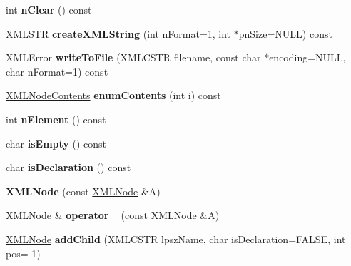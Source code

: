 \begin{DoxyCompactItemize}
int {\bfseries n\+Clear} () const
\item 
\mbox{\label{struct_x_m_l_node_a9e19d3587f88f503ff1cfd98fcd13cb1}} 
X\+M\+L\+S\+TR {\bfseries create\+X\+M\+L\+String} (int n\+Format=1, int $\ast$pn\+Size=N\+U\+LL) const
\item 
\mbox{\label{struct_x_m_l_node_acef9de855bd31c6cda5482cb296f28ae}} 
X\+M\+L\+Error {\bfseries write\+To\+File} (X\+M\+L\+C\+S\+TR filename, const char $\ast$encoding=N\+U\+LL, char n\+Format=1) const
\item 
\mbox{\label{struct_x_m_l_node_a2406beecada2b815907eaac2c7db035b}} 
\hyperlink{struct_x_m_l_node_contents}{X\+M\+L\+Node\+Contents} {\bfseries enum\+Contents} (int i) const
\item 
\mbox{\label{struct_x_m_l_node_a1b13a6dc1cb8e7248caedd4960d7ba60}} 
int {\bfseries n\+Element} () const
\item 
\mbox{\label{struct_x_m_l_node_ab888c4755daee4a2f976713531f1e3c3}} 
char {\bfseries is\+Empty} () const
\item 
\mbox{\label{struct_x_m_l_node_affcffca699c492a1d26a037e958c14f5}} 
char {\bfseries is\+Declaration} () const
\item 
\mbox{\label{struct_x_m_l_node_a138099a1355b9d4103c239d9042adad3}} 
{\bfseries X\+M\+L\+Node} (const \hyperlink{struct_x_m_l_node}{X\+M\+L\+Node} \&A)
\item 
\mbox{\label{struct_x_m_l_node_ac7201d06ce47509423dd7cc937e69cf8}} 
\hyperlink{struct_x_m_l_node}{X\+M\+L\+Node} \& {\bfseries operator=} (const \hyperlink{struct_x_m_l_node}{X\+M\+L\+Node} \&A)
\item 
\mbox{\label{struct_x_m_l_node_a71645ec6bcd94ff4bff62810377954ce}} 
\hyperlink{struct_x_m_l_node}{X\+M\+L\+Node} {\bfseries add\+Child} (X\+M\+L\+C\+S\+TR lpsz\+Name, char is\+Declaration=F\+A\+L\+SE, int pos=-\/1)
\item 
\mbox{\label{struct_x_m_l_node_a7938c43648ce7ed32efc9f0a5e3b5d2c}} 

\end{DoxyCompactItemize}
